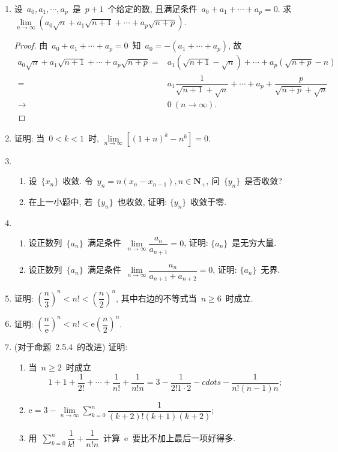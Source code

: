 \documentclass[UTF8,a4paper,10pt,twoside]{book}
\newcommand{\e}{\mathrm e}
\begin{document}
\begin{enumerate}
	\item 设~$a_0, a_1, \cdots ,a_p$~是~$p+1$~个给定的数, 且满足条件~$a_0+a_1+\cdots+a_p=0$. 求~$\lim\limits_{n\to\infty} (a_0\sqrt{n}+a_1\sqrt{n+1}+\cdots+a_p\sqrt{n+p})$.
	      \begin{proof}
		      由~$a_0+a_1+\cdots+a_p=0$~知~$a_0=-(a_1+\cdots+a_p)$, 故
		      \[
			      \begin{split}
				      a_0\sqrt{n}+a_1\sqrt{n+1}+\cdots+a_p\sqrt{n+p}=&a_1(\sqrt{n+1}-\sqrt{n})+\cdots+a_p(\sqrt{n+p}-{n})\\
				      =&a_1\dfrac{1}{\sqrt{n+1}+\sqrt{n}}+\cdots+a_p+\dfrac{p}{\sqrt{n+p}+\sqrt{n}}\\
				      \to&0 \ (n\to\infty).
			      \end{split}
		      \]
	      \end{proof}

	\item 证明: 当~$0<k<1$~时, $\lim\limits_{n\to\infty} [(1+n)^k-n^k]=0$.

	\item
	      \begin{enumerate}[(1)]
		      \item 设~$\{x_n\}$~收敛. 令~$y_n=n(x_n-x_{n-1}), n\in\mathbf{N}_{+}$, 问~$\{y_n\}$~是否收敛?
		      \item 在上一小题中, 若~$\{y_n\}$~也收敛, 证明: $\{y_n\}$~收敛于零.
	      \end{enumerate}

	\item
	      \begin{enumerate}[(1)]
		      \item 设正数列~$\{a_n\}$~满足条件~$\lim\limits_{n\to\infty} \dfrac{a_n}{a_{n+1}}=0$, 证明: $\{a_n\}$~是无穷大量.
		      \item 设正数列~$\{a_n\}$~满足条件~$\lim\limits_{n\to\infty} \dfrac{a_n}{a_{n+1}+a_{n+2}}=0$, 证明: $\{a_n\}$~无界.
	      \end{enumerate}

	\item 证明: $\left(\dfrac{n}{3}\right)^n<n!<\left(\dfrac{n}{2}\right)^n$, 其中右边的不等式当~$n\geqslant 6$~时成立.

	\item 证明: $\left(\dfrac{n}{\e}\right)^n<n!<\e\left(\dfrac{n}{2}\right)^n$.

	\item (对于命题~2.5.4~的改进) 证明:
	      \begin{enumerate}[(1)]
		      \item  当~$n\geqslant 2$~时成立
		            \[
			            1+1+\dfrac{1}{2!}+\cdots+\dfrac{1}{n!}+\dfrac{1}{n!n}=3-\dfrac{1}{2!1\cdot 2}-cdots-\dfrac{1}{n!(n-1)n};
		            \]
		      \item $\e=3-\lim\limits_{n\to\infty} \displaystyle\sum_{k=0}^n\dfrac{1}{(k+2)!(k+1)(k+2)}$;
		      \item 用~$\displaystyle \sum\limits_{k=0}^n\dfrac{1}{k!}+\dfrac{1}{n!n}$~计算~$\e$~要比不加上最后一项好得多.
	      \end{enumerate}


\end{enumerate}
\end{document}
